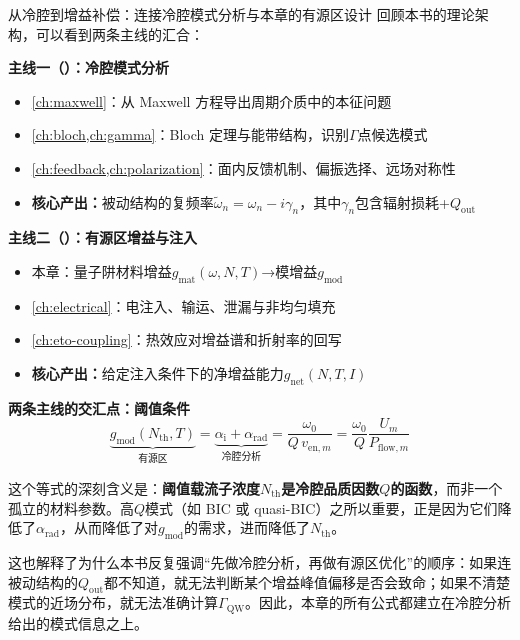 \begin{ConnectionBox}{从冷腔到增益补偿：连接冷腔模式分析与本章的有源区设计}
回顾本书的理论架构，可以看到两条主线的汇合：

\textbf{主线一（）：冷腔模式分析}
\begin{itemize}
  \item \cref{ch:maxwell}：从 Maxwell 方程导出周期介质中的本征问题
  \item \cref{ch:bloch,ch:gamma}：Bloch 定理与能带结构，识别$\Gamma$点候选模式
  \item \cref{ch:feedback,ch:polarization}：面内反馈机制、偏振选择、远场对称性
  \item \textbf{核心产出：}被动结构的复频率$\tilde{\omega}_n=\omega_n-i\gamma_n$，其中$\gamma_n$包含辐射损耗+$Q_\text{out}$
\end{itemize}

\textbf{主线二（）：有源区增益与注入}
\begin{itemize}
  \item 本章：量子阱材料增益$g_\text{mat}(\omega,N,T)$→模增益$g_\text{mod}$
  \item \cref{ch:electrical}：电注入、输运、泄漏与非均匀填充
  \item \cref{ch:eto-coupling}：热效应对增益谱和折射率的回写
  \item \textbf{核心产出：}给定注入条件下的净增益能力$g_\text{net}(N,T,I)$
\end{itemize}

\textbf{两条主线的交汇点：阈值条件}
\[
\underbrace{g_{\mathrm{mod}}(N_{\mathrm{th}},T)}_{\text{有源区}}
=
\underbrace{\alpha_{\mathrm{i}}+\alpha_{\mathrm{rad}}}_{\text{冷腔分析}}
=
\frac{\omega_0}{Q\,v_{\mathrm{en},m}}
=
\frac{\omega_0}{Q}\frac{U_m}{P_{\mathrm{flow},m}}
\]

这个等式的深刻含义是：\textbf{阈值载流子浓度}$N_\text{th}$\textbf{是冷腔品质因数$Q$的函数}，而非一个孤立的材料参数。高$Q$模式（如 BIC 或 quasi-BIC）之所以重要，正是因为它们降低了$\alpha_\text{rad}$，从而降低了对$g_\text{mod}$的需求，进而降低了$N_\text{th}$。

这也解释了为什么本书反复强调“先做冷腔分析，再做有源区优化”的顺序：如果连被动结构的$Q_\text{out}$都不知道，就无法判断某个增益峰值偏移是否会致命；如果不清楚模式的近场分布，就无法准确计算$\Gamma_\text{QW}$。因此，本章的所有公式都建立在冷腔分析给出的模式信息之上。
\end{ConnectionBox}

